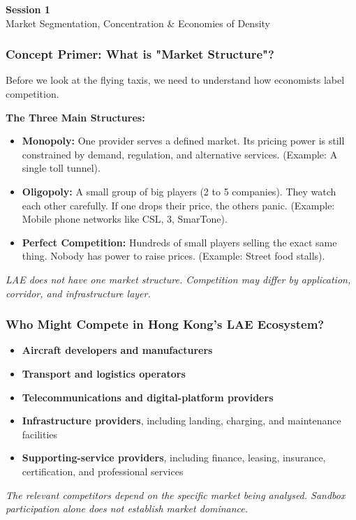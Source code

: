 \documentclass{beamer}
\begin{document}
\begin{frame}[c]
  \begin{center}
    \huge\color{cuhkpurple}\textbf{Session 1}\\
    \vspace{0.5cm}
    \Large Market Segmentation, Concentration \& Economies of Density
  \end{center}
\end{frame}

\begin{frame}[t]
  \frametitle{Concept Primer: What is "Market Structure"?}
  
  Before we look at the flying taxis, we need to understand how economists label competition.

  \vspace{0.3cm}
  \textbf{The Three Main Structures:}
  \begin{itemize}
      \item \textbf{Monopoly:} One provider serves a defined market. Its pricing power is still constrained by demand, regulation, and alternative services. (Example: A single toll tunnel).
      \item \textbf{Oligopoly:} A small group of big players (2 to 5 companies). They watch each other carefully. If one drops their price, the others panic. (Example: Mobile phone networks like CSL, 3, SmarTone).
      \item \textbf{Perfect Competition:} Hundreds of small players selling the exact same thing. Nobody has power to raise prices. (Example: Street food stalls).
  \end{itemize}
  
  \vspace{0.3cm}
  \textit{LAE does not have one market structure. Competition may differ by application, corridor, and infrastructure layer.}
\end{frame}

\begin{frame}[t]
\frametitle{Who Might Compete in Hong Kong's LAE Ecosystem?}
\begin{itemize}
\item \textbf{Aircraft developers and manufacturers}
\item \textbf{Transport and logistics operators}
\item \textbf{Telecommunications and digital-platform providers}
\item \textbf{Infrastructure providers}, including landing, charging, and maintenance facilities
\item \textbf{Supporting-service providers}, including finance, leasing, insurance, certification, and professional services
\end{itemize}
\textit{The relevant competitors depend on the specific market being analysed. Sandbox participation alone does not establish market dominance.}
\end{frame}
\end{document}
